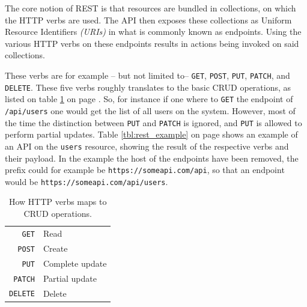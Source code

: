 			The core notion of REST is that resources are bundled in collections, on which the HTTP verbs are used. The API then exposes these collections as Uniform Resource Identifiers \emph{(URIs)} in what is commonly known as endpoints. Using the various HTTP verbs on these endpoints results in actions being invoked on said collections.

			These verbs are for example -- but not limited to-- \verb=GET=, \verb=POST=, \verb=PUT=, \verb=PATCH=, and \verb=DELETE=. These five verbs roughly translates to the basic CRUD operations, as listed on table \ref{tbl:verbs} on page \pageref{tbl:verbs}. So, for instance if one where to \verb=GET= the endpoint of \verb=/api/users= one would get the list of all users on the system. However, most of the time the distinction between \verb=PUT= and \verb=PATCH= is ignored, and \verb=PUT= is allowed to perform partial updates. Table \ref{tbl:rest_example} on page \pageref{tbl:rest_example} shows an example of an API on the \verb=users= resource, showing the result of the respective verbs and their payload. In the example the host of the endpoints have been removed, the prefix could for example be \verb=https://someapi.com/api=, so that an endpoint would be \verb=https://someapi.com/api/users=.

			\begin{table}
				\begin{tabular}{r|l}
					\verb=GET= 		& Read 				\\
					\verb=POST= 	& Create 			\\
					\verb=PUT= 		& Complete update 	\\
					\verb=PATCH= 	& Partial update 	\\
					\verb=DELETE= 	& Delete 			\\
				\end{tabular}

				\caption{How HTTP verbs maps to CRUD operations.}
				\label{tbl:verbs}

			\end{table}

